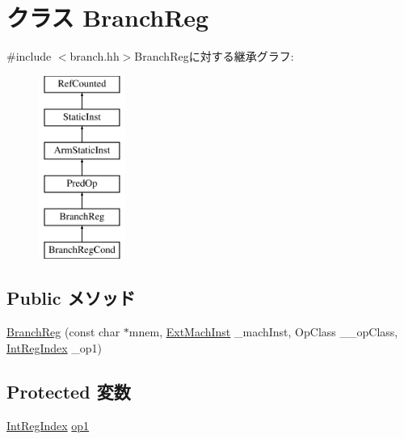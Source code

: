 \hypertarget{classArmISA_1_1BranchReg}{
\section{クラス BranchReg}
\label{classArmISA_1_1BranchReg}
}


{\ttfamily \#include $<$branch.hh$>$}BranchRegに対する継承グラフ:\begin{figure}[H]
\begin{center}
\leavevmode
\includegraphics[height=6cm]{classArmISA_1_1BranchReg}
\end{center}
\end{figure}
\subsection*{Public メソッド}
\begin{DoxyCompactItemize}
\item 
\hyperlink{classArmISA_1_1BranchReg_ac595e065da0b87321e3e337c67675e45}{BranchReg} (const char $\ast$mnem, \hyperlink{classStaticInst_a5605d4fc727eae9e595325c90c0ec108}{ExtMachInst} \_\-machInst, OpClass \_\-\_\-opClass, \hyperlink{namespaceArmISA_ae64680ba9fb526106829d6bf92fc791b}{IntRegIndex} \_\-op1)
\end{DoxyCompactItemize}
\subsection*{Protected 変数}
\begin{DoxyCompactItemize}
\item 
\hyperlink{namespaceArmISA_ae64680ba9fb526106829d6bf92fc791b}{IntRegIndex} \hyperlink{classArmISA_1_1BranchReg_a4c465c43ad568f8bcf8ae71480e9cfea}{op1}
\end{DoxyCompactItemize}


